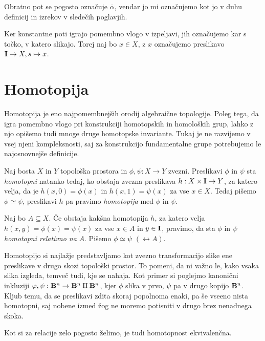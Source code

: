 \documentclass[11pt, a4paper]{article}
\begin{document}
\begin{opomba}
    Obratno pot se pogosto označuje $\overline\alpha$, vendar jo mi označujemo kot jo v duhu definicij in izrekov v sledečih poglavjih.
\end{opomba}


Ker konstantne poti igrajo pomembno vlogo v izpeljavi, jih označujemo kar s točko, v katero slikajo. Torej naj bo $x \in X$, z $x$ označujemo preslikavo $\mathbf{I} \to X, s \mapsto x$.


\section{Homotopija}


Homotopija je eno najpomembnejših orodij algebraične topologije. Poleg tega, da igra pomembno vlogo pri konstrukciji homotopskih in homoloških grup, lahko z njo opišemo tudi mnoge druge homotopske invariante. Tukaj je ne razvijemo v vsej njeni kompleksnosti, saj za konstrukcijo fundamentalne grupe potrebujemo le najosnovnejše definicije.


\begin{definicija}
    Naj bosta $X$ in $Y$ topološka prostora in $\phi, \psi : X \to Y$ zvezni. Preslikavi $\phi$ in $\psi$ sta \textit{homotopni} natanko tedaj, ko obstaja zvezna preslikava $h : X \times \mathbf{I} \to Y$, za katero velja, da je $h(x, 0) = \phi(x)$ in $h(x, 1) = \psi(x)$ za vse $x \in X$. Tedaj pišemo $\phi \simeq \psi$, preslikavi $h$ pa pravimo \textit{homotopija} med $\phi$ in $\psi$.

    Naj bo $A \subseteq X$. Če obstaja kakšna homotopija $h$, za katero velja $h(x, y) = \phi(x) = \psi(x)$ za vse $x \in A$ in $y \in \mathbf{I}$, pravimo, da sta $\phi$ in $\psi$ \textit{homotopni relativno na} $A$. Pišemo $\phi \simeq \psi$ $(\rel A)$.
\end{definicija}


Homotopijo si najlažje predstavljamo kot zvezno transformacijo slike ene preslikave v drugo skozi topološki prostor. To pomeni, da ni važno le, kako vsaka slika izgleda, temveč tudi, kje se nahaja. Kot primer si poglejmo kanonični inkluziji $\varphi, \psi : \mathbf{B}^n \to \mathbf{B}^n \amalg \mathbf{B}^n$, kjer $\phi$ slika v prvo, $\psi$ pa v drugo kopijo $\mathbf{B}^n$. Kljub temu, da se preslikavi zdita skoraj popolnoma enaki, pa še vseeno nista homotopni, saj nobene izmed žog ne moremo potisniti v drugo brez nenadnega skoka.

Kot si za relacije zelo pogosto želimo, je tudi homotopnost ekvivalenčna.
\end{document}

